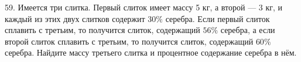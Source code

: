59. Имеется три слитка. Первый слиток имеет массу 5 кг, а второй --- 3 кг, и каждый из этих двух слитков содержит $30\%$ серебра. Если первый слиток сплавить с третьим, то получится слиток, содержащий $56\%$ серебра, а если второй слиток сплавить с третьим, то получится слиток, содержащий $60\%$ серебра. Найдите массу третьего слитка и процентное содержание серебра в нём.\\

